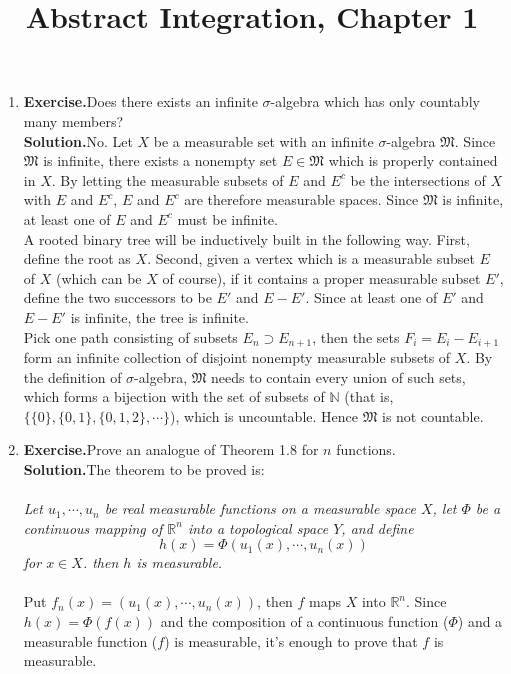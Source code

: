 \documentclass{article}
\begin{document}
\newcommand{\solution}{\textbf{{\normalsize Solution.}\quad}}
\newcommand{\exercise}{\textbf{{\normalsize Exercise.}\quad}}
\newcommand{\bigM}{\mathfrak{M}}
\title{Abstract Integration, Chapter 1}
\maketitle
\begin{enumerate}
	\item \exercise Does there exists an infinite $\sigma$-algebra which has only countably many members?\\
		\solution No. Let $X$ be a measurable set with an infinite $\sigma$-algebra $\bigM$. 
		Since $\bigM$ is infinite, there exists a nonempty set $E\in\bigM$ which is properly contained in $X$. By letting the measurable subsets of $E$ and $E^c$ be the intersections of $X$ with $E$ and $E^c$, $E$ and $E^c$ are therefore measurable spaces. Since $\bigM$ is infinite, at least one of $E$ and $E^c$ must be infinite.\\
		A rooted binary tree will be inductively built in the following way. First, define the root as $X$. Second, given a vertex which is a measurable subset $E$ of $X$ (which can be $X$ of course), if it contains a proper measurable subset $E'$, define the two successors to be $E'$ and $E-E'$. Since at least one of $E'$ and $E-E'$ is infinite, the tree is infinite.\\
		Pick one path consisting of subsets $E_{n}\supset{E_{n+1}}$, then the sets $F_i=E_i-E_{i+1}$ form an infinite collection of disjoint nonempty{\scriptsize } measurable subsets of $X$. By the definition of $\sigma$-algebra, $\bigM$ needs to contain every union of such sets, which forms a bijection with the set of subsets of $\mathbb{N}$ (that is,  $\{\{0\},\{0,1\},\{0,1,2\},\cdots\}$), which is uncountable. Hence $\bigM$ is not countable.
	\item \exercise Prove an analogue of Theorem 1.8 for $n$ functions.\\
		\solution The theorem to be proved is:\\
		\\
		\textit{Let $u_1,\cdots,u_n$ be real measurable functions on a measurable space $X$, let $\Phi$ be a continuous mapping of $\mathbb{R}^n$ into a topological space $Y$, and define \[h(x)=\Phi(u_1(x),\cdots,u_n(x))\] for $x\in{X}$. then $h$ is measurable.}\\
		\\
		Put $f_n(x)=(u_1(x),\cdots,u_n(x))$, then $f$ maps $X$ into $\mathbb{R}^n$. Since $h(x)=\Phi(f(x))$ and the composition of a continuous function ($\Phi$) and a measurable function ($f$) is measurable, it's enough to prove that $f$ is measurable.\\

\end{enumerate}
\end{document}
